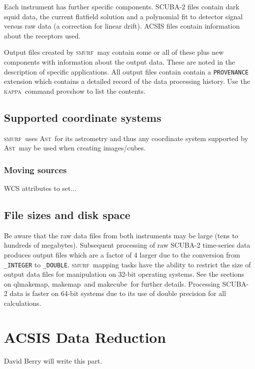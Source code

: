 \documentclass[twoside,11pt]{article}
\newcommand{\xref}[3]{#1}
\newcommand{\xlabel}[1]{}
\renewcommand{\_}{\texttt{\symbol{95}}}
\newcommand{\KAPPA}{\textsc{kappa}}
\newcommand{\SMURF}{\textsc{smurf}}
\newcommand{\AST}{\textsc{Ast}}
\newcommand{\task}[1]{\textsf{#1}}
\newcommand{\makecube}{\xref{\task{makecube}}{sun258}{MAKECUBE}}
\newcommand{\qlmakemap}{\xref{\task{qlmakemap}}{sun258}{QLMAKEMAP}}
\newcommand{\makemap}{\xref{\task{makemap}}{sun258}{MAKEMAP}}
\begin{document}
Each instrument has further specific components. SCUBA-2 files contain
dark squid data, the current flatfield solution and a polynomial fit
to detector signal versus raw data (a correction for linear drift).
ACSIS files contain information about the receptors used.

Output files created by \SMURF\ may contain some or all of these plus
new components with information about the output data. These are noted
in the description of specific applications. All output files contain
contain a \texttt{PROVENANCE} extension which contains a detailed
record of the data processing history. Use the \KAPPA\ command
provshow to list the contents.

\subsection{Supported coordinate systems}

\SMURF\ uses \AST\ for its astrometry and thus any coordinate system
supported by \AST\ may be used when creating images/cubes.

\subsubsection{Moving sources}

WCS attributes to set...

\subsection{File sizes and disk space}

Be aware that the raw data files from both instruments may be large
(tens to hundreds of megabytes). Subsequent processing of raw SCUBA-2
time-series data produces output files which are a factor of 4 larger
due to the conversion from \verb+_INTEGER+ to \verb+_DOUBLE+. \SMURF\
mapping tasks have the ability to restrict the size of output data
files for manipulation on 32-bit operating systems. See the sections
on \qlmakemap, \makemap\ and \makecube\ for further
details. Processing SCUBA-2 data is faster on 64-bit systems due to
its use of double precision for all calculations.

\section{\xlabel{acsis}ACSIS Data Reduction\label{se:acsisdr}}

David Berry will write this part.
\end{document}
